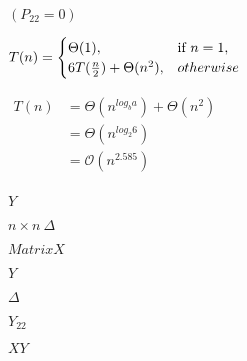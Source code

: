 \documentclass[10pt]{book}
\begin{document}
\begin{mdSnippets}
\begin{mdInlineSnippet}%
$(P_{22} = 0)$\end{mdInlineSnippet}%
\begin{mdInlineSnippet}[53a55fd5f1de14e3c8dd324108707edf]%
$\begin{aligned}T(n) &= \begin{cases}\Theta(1),  & \text{if } n = 1,\\6T({n \over 2}) + \Theta(n^{2}), & otherwise\end{cases}\end{aligned}$\end{mdInlineSnippet}%
\begin{mdInlineSnippet}[edce6f540c6124490c053022c7c0535a]%
$\begin{aligned}T(n) &= \Theta(n^{log_{b} a}) + \Theta(n^{2})\\   &= \Theta(n^{log_{2} 6})\\ &= \mathcal{O}{(n^{2.585})}\\\end{aligned} $\end{mdInlineSnippet}%
\begin{mdInlineSnippet}[57cec4137b614c87cb4e24a3d003a3e0]%
$Y$\end{mdInlineSnippet}%
\begin{mdInlineSnippet}[b90730a0a57c4f06ed9be3903c8fa6dc]%
$n \times n~\Delta$\end{mdInlineSnippet}%
\begin{mdInlineSnippet}[b1c44a5250384548467c89a25e04f781]%
$Matrix X$\end{mdInlineSnippet}%
\begin{mdInlineSnippet}[57cec4137b614c87cb4e24a3d003a3e0]%
$Y$\end{mdInlineSnippet}%
\begin{mdInlineSnippet}[967878d1da852d4b07a961e3168b0fff]%
$\Delta$\end{mdInlineSnippet}%
\begin{mdInlineSnippet}[3165313348ba27e1079960bff02d2249]%
$Y_{22}$\end{mdInlineSnippet}%
\begin{mdInlineSnippet}%
$XY$\end{mdInlineSnippet}%

\end{mdSnippets}
\end{document}
